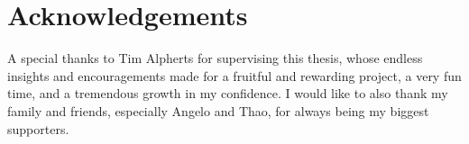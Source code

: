 \section{Acknowledgements}
\label{sec:acknowledgements}

A special thanks to Tim Alpherts for supervising this thesis, whose endless insights and encouragements made for a fruitful and rewarding project, a very fun time, and a tremendous growth in my confidence. I would like to also thank my family and friends, especially Angelo and Thao, for always being my biggest supporters.
